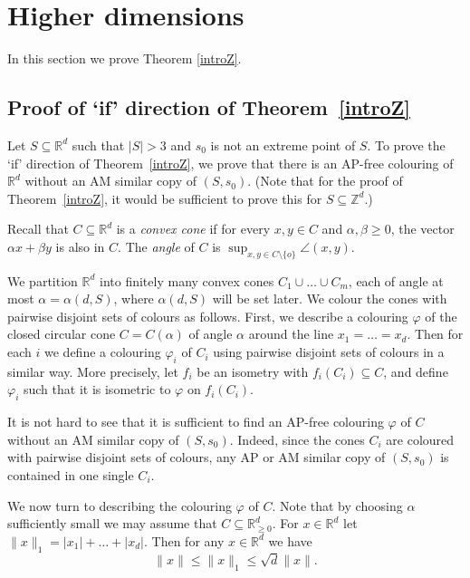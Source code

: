 \documentclass[12pt]{article}
\newcommand{\R}{{\mathbb R}}
\theoremstyle{plain}
\theoremstyle{definition}
\begin{document}
\section{Higher dimensions}\label{3}
In this section we prove Theorem \ref{introZ}. 




\subsection{Proof of `if' direction of Theorem~\ref{introZ}}\label{32}
Let $S\subseteq \mathbb{R}^d$ such that $|S|>3$ and $s_0$ is not an extreme point of $S$. To prove the ‘if’ direction of Theorem~\ref{introZ}, we prove that there is an AP-free colouring of $\mathbb{R}^d$ without an AM similar copy of $(S,s_0)$. (Note that for the proof of Theorem~\ref{introZ}, it would be sufficient to prove this for $S\subseteq \mathbb{Z}^d$.)



Recall that $C\subseteq \mathbb{R}^d$ is a \emph{convex cone} if for every $x,y\in C$ and $\alpha,\beta\geq 0$, the vector $\alpha x+\beta y$ is also in $C$.
The \emph{angle} of $C$ is $\sup_{x,y\in C\setminus\{o\}}\angle(x,y)$.



We partition $\R^d$ into finitely many convex cones $C_1\cup\dots\cup C_m$, each of angle at most $\alpha=\alpha(d,S)$, where $\alpha(d,S)$ will be set later. We colour the cones with pairwise disjoint sets of colours as follows. First, we describe a colouring $\varphi$ of the closed circular cone $C=C(\alpha)$ of angle $\alpha$ around the line $x_1=\dots=x_d$. Then for each $i$ we define a colouring $\varphi_i$ of $C_i$ using pairwise disjoint sets of colours in a similar way. More precisely, let $f_i$ be an isometry with $f_i(C_i)\subseteq C$, and define $\varphi_i$ such that it is isometric to $\varphi$ on $f_i(C_i)$.

It is not hard to see that it is sufficient to find an AP-free colouring $\varphi$ of $C$ without an AM similar copy of $(S,s_0)$. Indeed, since the cones $C_i$ are coloured with pairwise disjoint sets of colours, any AP or AM similar copy of $(S,s_0)$ is contained in one single $C_i$.

We now turn to describing the colouring $\varphi$ of $C$.
Note that by choosing $\alpha$ sufficiently small we may assume that $C\subseteq \mathbb{R}_{\geq 0}^d$.
For $x\in \mathbb R^d$ let $\|x\|_1=|x_1|+\dots+|x_d|$.  Then for any $x\in \mathbb{R}^d$ we have
\begin{equation}\label{upperf}
\|x\|\leq \|x\|_1\leq \sqrt{d}\|x\|.
\end{equation}
\end{document}
